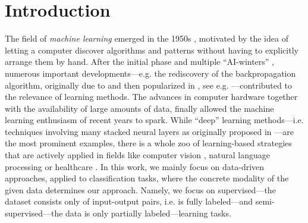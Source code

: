 \chapter{Introduction}
%
%
The field of \textit{machine learning} emerged in the 1950s \cite{samuel1959some, rosenblatt1958perceptron}, motivated by the idea of letting a computer discover algorithms and patterns without having to explicitly arrange them by hand. After the initial phase and multiple \enquote{AI-winters} \cite{steele1996evolution}, numerous important developments---e.g. the rediscovery of the backpropagation algorithm, originally due to \cite{kelley1960gradient,rosenblatt1962principles} and then popularized in \cite{rumelhart1986learning}, see e.g. \cite{schmidhuber2022annotated}---contributed to the relevance of learning methods. The advances in computer hardware together with the availability of large amounts of data, finally allowed the machine learning enthusiasm of recent years to spark. While \enquote{deep} learning methods---i.e. techniques involving many stacked neural layers as originally proposed in \cite{rosenblatt1958perceptron}---are the most prominent examples, there is a whole zoo of learning-based strategies that are actively applied in fields like computer vision \cite{chai2021deep}, natural language processing \cite{khurana2023natural} or healthcare \cite{shehab2022machine}. In this work, we mainly focus on data-driven approaches, applied to classification tasks, where the concrete modality of the given data determines our approach. Namely, we focus on supervised---the dataset consists only of input-output pairs, i.e. is fully labeled---and semi-supervised---the data is only partially labeled---learning tasks.

